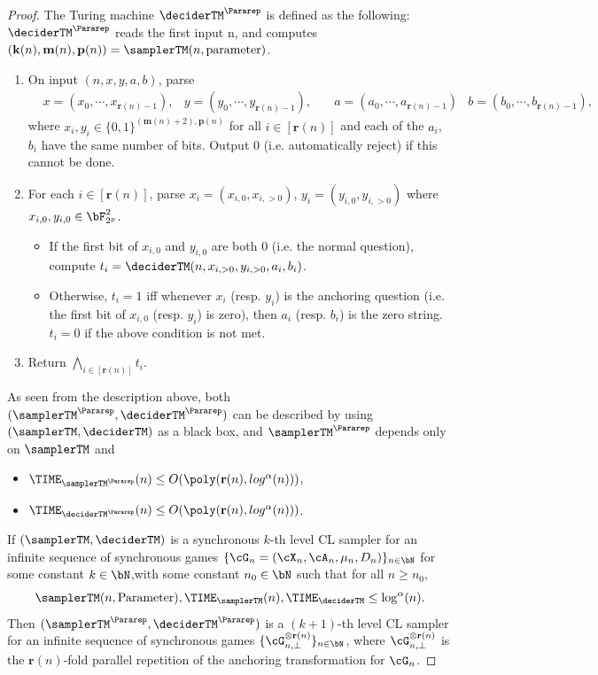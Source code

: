 \begin{proof}
	The Turing machine $\deciderTM^{\Pararep}$ is defined as the following:  $\deciderTM^{\Pararep}$ reads the first input n, and computes $(\mathbf{k}(n), \mathbf{m}(n) , \mathbf{p}(n)) = \samplerTM(n, \text{parameter})$. 
	\begin{enumerate}
		\item  On input $(n,x,y,a,b)$, parse
		\begin{align*}
			&x = (x_0, \cdots, x_{\mathbf{r}(n) -1 } ),  &y = (y_0, \cdots, y_{\mathbf{r}(n)-1} ), \quad &a = (a_0, \cdots, a_{\mathbf{r}(n) -1 } )  &b = (b_0, \cdots, b_{\mathbf{r}(n) -1 } ),
		\end{align*}
		where $x_i, y_i \in \{0,1\}^{ (\mathbf{m}(n) +2), \mathbf{p}(n)}$ for all $i \in [\mathbf{r}(n)]$ and each of the $a_i$, $b_i$ have the same number of bits. Output $0$ (i.e. automatically reject) if this cannot be done. 
		\item For each $i \in [\mathbf{r}(n)]$, parse $x_i = (x_{i,0}, x_{i,> 0})$,  $y_i = (y_{i,0}, y_{i,> 0})$ where $x_{i,0}, y_{i,0} \in \bF_{2^{p}}^2$. 
		\begin{itemize}
			\item If the first bit of $x_{i,0}$ and $y_{i,0}$ are both $0$ (i.e. the normal question), compute $t_i = \deciderTM(n, x_{i,> 0},  y_{i,> 0}, a_i, b_i)$.
			\item Otherwise, $t_i = 1$ iff whenever $x_{i}$ (resp. $y_{i}$) is the anchoring question (i.e. the first bit of $x_{i,0}$ (resp. $y_{i}$) is zero), then $a_i$ (resp. $b_i$) is the zero string. $t_i = 0$ if the above condition is not met.  
		\end{itemize}
		\item Return $\bigwedge_{i \in [\mathbf{r}(n)]} t_i$. 
	\end{enumerate}
	As seen from the description above, both $(\samplerTM^{\Pararep}, \deciderTM^{\Pararep})$ can be described by using  $(\samplerTM, \deciderTM)$  as a black box, and $\samplerTM^{\Pararep}$ depends only on $\samplerTM$ and 
	\begin{itemize}
		\item $\TIME_{\samplerTM^{\Pararep} }(n) \leq O(\poly(\mathbf{r}(n), log^{\alpha}(n)))$,
		\item $\TIME_{\deciderTM^{\Pararep} }(n) \leq O(\poly(\mathbf{r}(n), log^{\alpha}(n)))$.
	\end{itemize} 
	If $(\samplerTM, \deciderTM)$ is a synchronous $k$-th level CL sampler for an infinite sequence of synchronous games $\{\cG_n = (\cX_n,\cA_n, \mu_n, D_n )\}_{n \in \bN}$ for some constant $k \in \bN$,with some constant $n_0 \in \bN$ such that for all $n \geq n_0$,
	\begin{equation*}
		\samplerTM(n, \text{Parameter}), \TIME_{ \samplerTM }(n),\TIME_{ \deciderTM} \leq \log^{\alpha}(n). 
	\end{equation*}
	Then $(\samplerTM^{\Pararep}, \deciderTM^{\Pararep})$ is a $(k+1)$-th level CL sampler for an infinite sequence of synchronous games $\{\cG_{n, \bot}^{\otimes \mathbf{r}(n)}\}_{n \in \bN}$, where $\cG_{n, \bot}^{\otimes \mathbf{r}(n)}$ is the $\mathbf{r}(n)$-fold parallel repetition of the anchoring transformation for $\cG_n$.
	

\end{proof}
